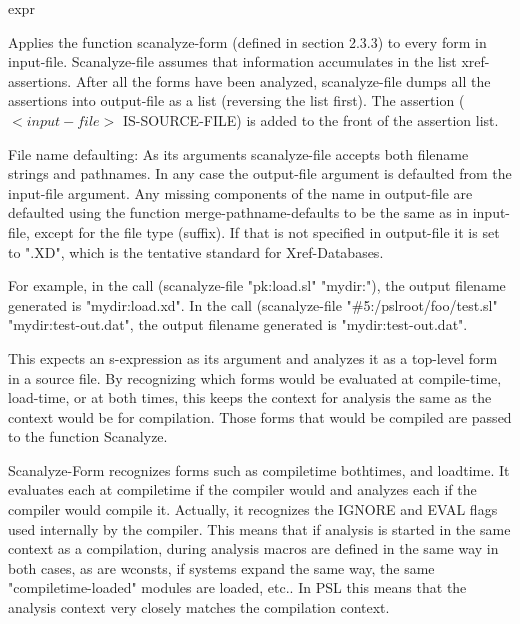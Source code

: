                  {expr}
{    Applies  the  function  scanalyze-form  (defined  in section
    2.3.3) to every form in input-file.  Scanalyze-file  assumes
    that  information  accumulates  in the list xref-assertions.
    After all the forms have been analyzed, scanalyze-file dumps
    all the assertions into output-file as a list (reversing the
    list first).  The assertion ($<input-file>$ IS-SOURCE-FILE) is
    added to the front of the assertion list.
    
				File  name  defaulting:  As  its  arguments   scanalyze-file
    accepts  both  filename  strings and pathnames.  In any case
    the output-file argument is defaulted  from  the  input-file
    argument.  Any missing components of the name in output-file
    are  defaulted using the function merge-pathname-defaults to
    be the same as in  input-file,  except  for  the  file  type
(suffix). If that is not specified in output-file it is set to
".XD", which is the tentative standard for Xref-Databases.

    For  example,  in  the  call  (scanalyze-file   "pk:load.sl"
    "mydir:"), the output filename generated is "mydir:load.xd".
    In   the   call   (scanalyze-file  "\#5:/pslroot/foo/test.sl"
    "mydir:test-out.dat",  the  output  filename  generated   is
    "mydir:test-out.dat".
}

{    This expects an s-expression as its argument and analyzes it
    as  a top-level form in a source file.  By recognizing which
    forms would be evaluated at compile-time, load-time,  or  at
    both  times, this keeps the context for analysis the same as
    the context would be for  compilation.    Those  forms  that
    would be compiled are passed to the function Scanalyze.}

    Scanalyze-Form   recognizes   forms   such   as  compiletime
    bothtimes, and loadtime.  It evaluates each  at  compiletime
    if  the  compiler  would  and  analyzes each if the compiler
    would compile it.  Actually, it recognizes  the  IGNORE  and
    EVAL flags used internally by the compiler.  This means that
    if analysis is started in the same context as a compilation,
    during  analysis  macros are defined in the same way in both
    cases, as are wconsts, if systems expand the same  way,  the
    same  "compiletime-loaded" modules are loaded, etc..  In PSL
    this means that the analysis context  very  closely  matches
    the compilation context.

